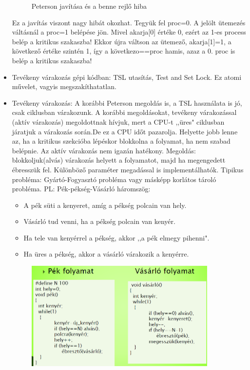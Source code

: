 \documentclass[margin=0px]{article}
\begin{document}
\begin{itemize}
\begin{figure}[H]
              \caption{Peterson javítása és a benne rejlő hiba}
          \end{figure}
          Ez a javítás viszont nagy hibát okozhat. Tegyük fel proc=0. A jelölt ütemezés váltásnál a proc=1 belépése jön. Mivel akarja[0] értéke 0, ezért az 1-es process belép a kritikus szakaszba! Ekkor újra váltson az ütemező, akarja[1]=1, a következő értéke szintén 1, így a következo==proc hamis, azaz a 0. proc is belép a kritikus szakaszba!
    \item Tevékeny várakozás gépi kódban: TSL utasítás, Test and Set Lock. Ez atomi művelet, vagyis megszakíthatatlan.
    \item Tevékeny várakozás: A korábbi Peterson megoldás is, a TSL használata is jó, csak ciklusban várakozunk. A korábbi megoldásokat, tevékeny várakozással (aktív várakozás) megoldottnak hívjuk, mert a CPU-t ,,üres" ciklusban járatjuk a várakozás során.De ez a CPU időt pazarolja. Helyette jobb lenne az, ha a kritikus szekcióba lépéskor blokkolna a folyamat, ha nem szabad belépnie. Az aktív várakozás nem igazán hatékony. Megoldás: blokkoljuk(alvás) várakozás helyett a folyamatot, majd ha megengedett ébresszük fel. Különböző paraméter megadással is implementálhatók. Tipikus probléma: Gyártó-Fogyasztó probléma vagy másképp korlátos tároló probléma. PL: Pék-pékség-Vásárló háromszög:
          \begin{itemize}
              \item A pék süti a kenyeret, amíg a pékség polcain van hely.
              \item Vásárló tud venni, ha a pékség polcain van kenyér.
              \item Ha tele van kenyérrel a pékség, akkor ,,a pék elmegy pihenni".
              \item Ha üres a pékség, akkor a vásárló várakozik a kenyérre.
          \end{itemize}
          \begin{figure}[H]
              \centering
              \includegraphics[width=0.9\textwidth]{img/pekvasarlo.png}

\end{figure}
\end{itemize}
\end{document}
